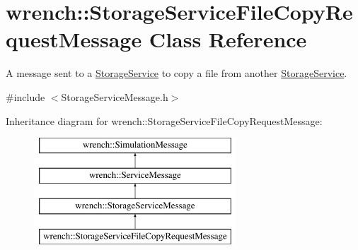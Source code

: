 \hypertarget{classwrench_1_1_storage_service_file_copy_request_message}{}\section{wrench\+:\+:Storage\+Service\+File\+Copy\+Request\+Message Class Reference}
\label{classwrench_1_1_storage_service_file_copy_request_message}


A message sent to a \hyperlink{classwrench_1_1_storage_service}{Storage\+Service} to copy a file from another \hyperlink{classwrench_1_1_storage_service}{Storage\+Service}.  




{\ttfamily \#include $<$Storage\+Service\+Message.\+h$>$}

Inheritance diagram for wrench\+:\+:Storage\+Service\+File\+Copy\+Request\+Message\+:\begin{figure}[H]
\begin{center}
\leavevmode
\includegraphics[height=4.000000cm]{classwrench_1_1_storage_service_file_copy_request_message}
\end{center}
\end{figure}
